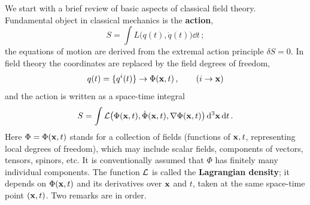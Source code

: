 We start with a brief review of basic aspects of classical field theory.
Fundamental object in classical mechanics is the \textbf{action},
\[
S=\int L\bigl(q(t),\dot q(t)\bigr)\dd t\,;
\]
the equations of motion are derived from the extremal action principle
$\delta S=0$. In field theory the coordinates are replaced by the field
degrees of freedom,
\[
q(t)=\{q^i(t)\}\to \Phi(\mathbf{x},t)\,,\qquad (i\to\mathbf{x})
\]
and the action is written as a space-time integral
\[
S=\int \mathcal{L}\bigl(\Phi(\mathbf{x},t),\dot\Phi(\mathbf{x},t),\nabla\Phi(\mathbf{x},t)\bigr)\mathop{}\!\mathrm{d}^3\mathbf{x}\mathop{}\!\mathrm{d} t\,.
\]
Here $\Phi=\Phi(\mathbf{x},t)$ stands for a collection of fields (functions of
$\mathbf{x},t$, representing local degrees of freedom), which may include scalar
fields, components of vectors, tensors, spinors, etc. It is conventionally
assumed that $\Phi$ has finitely many individual components. The function
$\mathcal{L}$ is called the \textbf{Lagrangian density}; it depends on $\Phi(\mathbf{x},t)$
and its derivatives over $\mathbf{x}$ and $t$, taken at the same space-time point
$(\mathbf{x},t)$. Two remarks are in order.
